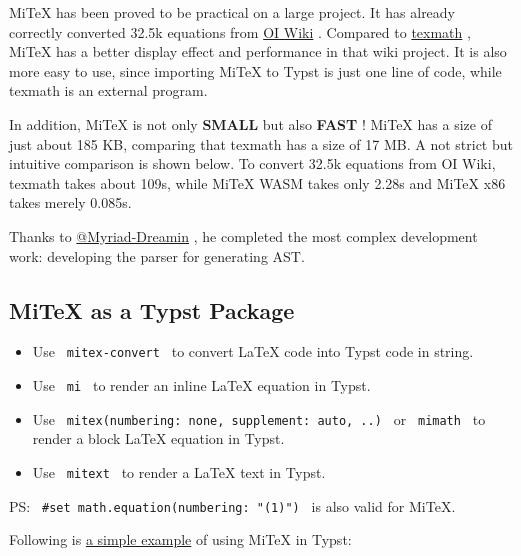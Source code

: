 MiTeX has been proved to be practical on a large project. It has already
correctly converted 32.5k equations from
\href{https://github.com/OI-wiki/OI-wiki}{OI Wiki} . Compared to
\href{https://github.com/jgm/texmath}{texmath} , MiTeX has a better
display effect and performance in that wiki project. It is also more
easy to use, since importing MiTeX to Typst is just one line of code,
while texmath is an external program.

In addition, MiTeX is not only \textbf{SMALL} but also \textbf{FAST} !
MiTeX has a size of just about 185 KB, comparing that texmath has a size
of 17 MB. A not strict but intuitive comparison is shown below. To
convert 32.5k equations from OI Wiki, texmath takes about 109s, while
MiTeX WASM takes only 2.28s and MiTeX x86 takes merely 0.085s.

Thanks to \href{https://github.com/Myriad-Dreamin}{@Myriad-Dreamin} , he
completed the most complex development work: developing the parser for
generating AST.

\subsection{MiTeX as a Typst Package}\label{mitex-as-a-typst-package}

\begin{itemize}
\tightlist
\item
  Use \texttt{\ mitex-convert\ } to convert LaTeX code into Typst code
  in string.
\item
  Use \texttt{\ mi\ } to render an inline LaTeX equation in Typst.
\item
  Use \texttt{\ mitex(numbering:\ none,\ supplement:\ auto,\ ..)\ } or
  \texttt{\ mimath\ } to render a block LaTeX equation in Typst.
\item
  Use \texttt{\ mitext\ } to render a LaTeX text in Typst.
\end{itemize}

PS: \texttt{\ \#set\ math.equation(numbering:\ "(1)")\ } is also valid
for MiTeX.

Following is
\href{https://github.com/mitex-rs/mitex/blob/main/packages/mitex/examples/example.typ}{a
simple example} of using MiTeX in Typst:

